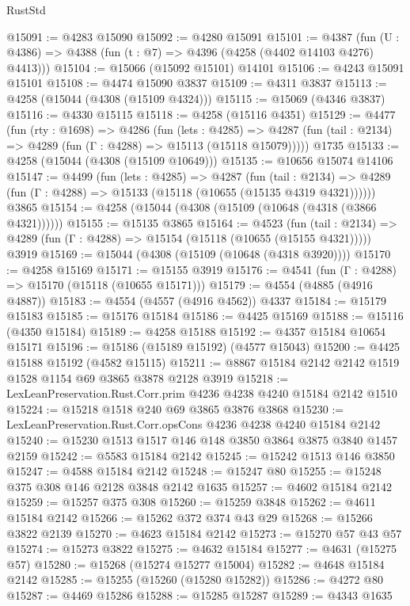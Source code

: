 \begin{lexlean}{RustStd}
\begin{coremodule}
{\begin{coremodule}
{{{{{{{{{{{{{{{{@15091 := @4283 @15090
@15092 := @4280 @15091
@15101 := @4387
    (fun (U : @4386) => @4388 (fun (t : @7) => @4396 (@4258 (@4402 @14103 @4276) @4413)))
@15104 := @15066 (@15092 @15101) @14101
@15106 := @4243 @15091 @15101
@15108 := @4474 @15090 @3837
@15109 := @4311 @3837
@15113 := @4258 (@15044 (@4308 (@15109 @4324)))
@15115 := @15069 (@4346 @3837)
@15116 := @4330 @15115
@15118 := @4258 (@15116 @4351)
@15129 := @4477
    (fun (rty : @1698) =>
    @4286
      (fun (lets : @4285) =>
      @4287 (fun (tail : @2134) => @4289 (fun (Γ : @4288) => @15113 (@15118 @15079)))))
    @1735
@15133 := @4258 (@15044 (@4308 (@15109 @10649)))
@15135 := @10656 @15074 @14106
@15147 := @4499
    (fun (lets : @4285) =>
    @4287
      (fun (tail : @2134) =>
      @4289 (fun (Γ : @4288) => @15133 (@15118 (@10655 (@15135 @4319 @4321))))))
    @3865
@15154 := @4258 (@15044 (@4308 (@15109 (@10648 (@4318 (@3866 @4321))))))
@15155 := @15135 @3865
@15164 := @4523
    (fun (tail : @2134) => @4289 (fun (Γ : @4288) => @15154 (@15118 (@10655 (@15155 @4321)))))
    @3919
@15169 := @15044 (@4308 (@15109 (@10648 (@4318 @3920))))
@15170 := @4258 @15169
@15171 := @15155 @3919
@15176 := @4541 (fun (Γ : @4288) => @15170 (@15118 (@10655 @15171)))
@15179 := @4554 (@4885 (@4916 @4887))
@15183 := @4554 (@4557 (@4916 @4562)) @4337
@15184 := @15179 @15183
@15185 := @15176 @15184
@15186 := @4425 @15169
@15188 := @15116 (@4350 @15184)
@15189 := @4258 @15188
@15192 := @4357 @15184 @10654 @15171
@15196 := @15186 (@15189 @15192) (@4577 @15043)
@15200 := @4425 @15188 @15192 (@4582 @15115)
@15211 := @8867 @15184 @2142 @2142 @1519 @1528 @1154 @69 @3865 @3878 @2128 @3919
@15218 := LexLeanPreservation.Rust.Corr.prim @4236 @4238 @4240 @15184 @2142 @1510
@15224 := @15218 @1518 @240 @69 @3865 @3876 @3868
@15230 := LexLeanPreservation.Rust.Corr.opsCons @4236 @4238 @4240 @15184 @2142
@15240 := @15230 @1513 @1517 @146 @148 @3850 @3864 @3875 @3840 @1457 @2159
@15242 := @5583 @15184 @2142
@15245 := @15242 @1513 @146 @3850
@15247 := @4588 @15184 @2142
@15248 := @15247 @80
@15255 := @15248 @375 @308 @146 @2128 @3848 @2142 @1635
@15257 := @4602 @15184 @2142
@15259 := @15257 @375 @308
@15260 := @15259 @3848
@15262 := @4611 @15184 @2142
@15266 := @15262 @372 @374 @43 @29
@15268 := @15266 @3822 @2139
@15270 := @4623 @15184 @2142
@15273 := @15270 @57 @43 @57
@15274 := @15273 @3822
@15275 := @4632 @15184
@15277 := @4631 (@15275 @57)
@15280 := @15268 (@15274 @15277 @15004)
@15282 := @4648 @15184 @2142
@15285 := @15255 (@15260 (@15280 @15282))
@15286 := @4272 @80
@15287 := @4469 @15286
@15288 := @15285 @15287
@15289 := @4343 @1635
}}}}}}}}}}}}}}}}
\end{coremodule}}
\end{coremodule}
\end{lexlean}
